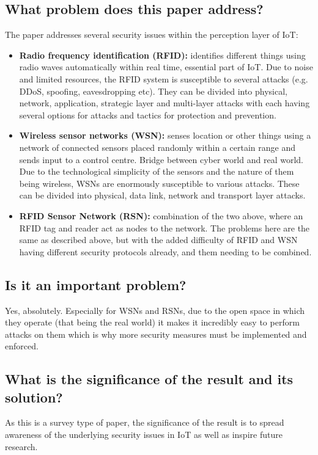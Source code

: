\documentclass[11pt,a4paper]{article}
\begin{document}
\subsection*{What problem does this paper address?}
The paper addresses several security issues within the perception layer of IoT: 

\begin{itemize}
    \item \textbf{Radio frequency identification (RFID):} identifies different things using radio waves automatically within real time, essential part of IoT. Due to noise and limited resources, the RFID system is susceptible to several attacks (e.g. DDoS, spoofing, eavesdropping etc). They can be divided into physical, network, application, strategic layer and multi-layer attacks with each having several options for attacks and tactics for protection and prevention.
    \item \textbf{Wireless sensor networks (WSN):} senses location or other things using a network of connected sensors placed randomly within a certain range and sends input to a control centre. Bridge between cyber world and real world. Due to the technological simplicity of the sensors and the nature of them being wireless, WSNs are enormously susceptible to various attacks. These can be divided into physical, data link, network and transport layer attacks.
    \item \textbf{RFID Sensor Network (RSN):} combination of the two above, where an RFID tag and reader act as nodes to the network. The problems here are the same as described above, but with the added difficulty of RFID and WSN having different security protocols already, and them needing to be combined.
\end{itemize}

\subsection*{Is it an important problem?}
Yes, absolutely. Especially for WSNs and RSNs, due to the open space in which they operate (that being the real world) it makes it incredibly easy to perform attacks on them which is why more security measures must be implemented and enforced. 

\subsection*{What is the significance of the result and its solution?}
As this is a survey type of paper, the significance of the result is to spread awareness of the underlying security issues in IoT as well as inspire future research.
\end{document}

